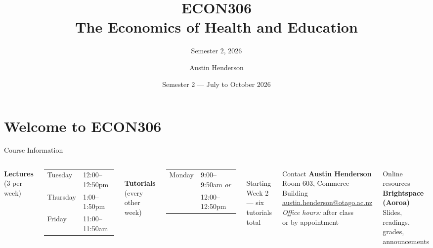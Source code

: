 \documentclass[aspectratio=169, 12pt]{beamer}
\title[ECON306: Health \& Education Economics]{ECON306\\The Economics of Health and Education}
\subtitle{Semester 2, 2026}
\author{Austin Henderson}
\institute{Department of Economics\\University of Otago}
\date{Semester 2 — July to October 2026}
\begin{document}
\begin{frame}[plain]
  \titlepage
\end{frame}



\section*{Welcome to ECON306}

\begin{frame}{Course Information}
  \begin{columns}
      \textbf{Lectures} (3 per week)\\[0.3em]
      \begin{tabular}{ll}
        Tuesday & 12:00--12:50pm \\
        Thursday & 1:00--1:50pm \\
        Friday & 11:00--11:50am \\
      \end{tabular}\\[0.8em]
      \textbf{Tutorials} (every other week)\\
      \begin{tabular}{ll}
        Monday & 9:00--9:50am \emph{or} \\
                & 12:00--12:50pm \\
      \end{tabular}\\[0.4em]
      {\footnotesize Starting Week 2 — six tutorials total}
      \begin{block}{Contact}
        \textbf{Austin Henderson}\\
        Room 603, Commerce Building\\
        \href{mailto:austin.henderson@otago.ac.nz}{austin.henderson@otago.ac.nz}\\[0.4em]
        \emph{Office hours:} after class\\
        or by appointment
      \end{block}
      \begin{alertblock}{Online resources}
        \textbf{Brightspace (Aoroa)}\\
        {\footnotesize Slides, readings, grades, announcements}
      \end{alertblock}
  \end{columns}
\end{frame}
\end{document}
